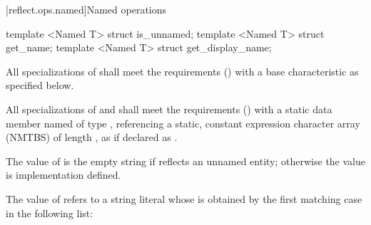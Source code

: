 [reflect.ops.named]{Named operations}

\begin{std.txt}\color{addclr}

\begin{itemdecl}
template <Named T> struct is_unnamed;
template <Named T> struct get_name;
template <Named T> struct get_display_name;
\end{itemdecl}

\begin{itemdescr}
\pnum
All specializations of  shall meet the  requirements () with a base characteristic as specified below.

\pnum
All specializations of  and  shall meet the  requirements () with a static data member named  of type , referencing a static, constant expression character array (NMTBS) of length , as if declared as .

\pnum
The value of  is the empty string if  reflects an unnamed entity; otherwise the value is implementation defined.

\pnum
The value of  refers to a string literal whose  is obtained by the first matching case in the following list:


\end{itemdescr}
\end{std.txt}

